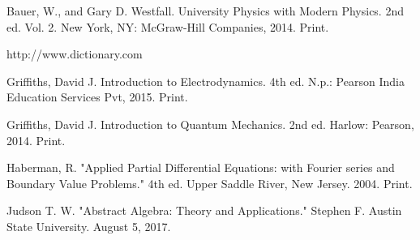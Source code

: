 {\footnotesize
\begin{thebibliography}{99}
	 Bauer, W., and Gary D. Westfall. University Physics with Modern Physics. 2nd ed. Vol. 2. New York, NY: McGraw-Hill Companies, 2014. Print. 	
	
	
	
	
	
	 http://www.dictionary.com
	
	 Griffiths, David J. Introduction to Electrodynamics. 4th ed. N.p.: Pearson India Education Services Pvt, 2015. Print. 
	
	
	  Griffiths, David J. Introduction to Quantum Mechanics. 2nd ed. Harlow: Pearson, 2014. Print. 
	
	 Haberman, R. "Applied Partial Differential Equations: with Fourier series and Boundary Value Problems." 4th ed. Upper Saddle River, New Jersey. 2004. Print.
	
	
	 Judson T. W. "Abstract Algebra: Theory and Applications." Stephen F. Austin State University. August 5, 2017.
	
	
	

\end{thebibliography}}
